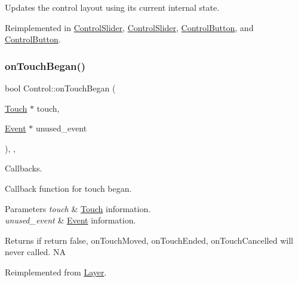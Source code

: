 Updates the control layout using its current internal state. 

Reimplemented in \hyperlink{classControlSlider_a52ab7abbbcefc12704917d04dfea67c9}{Control\+Slider}, \hyperlink{classControlSlider_a2325b1df970fb4aff1ccb29aea4a20ea}{Control\+Slider}, \hyperlink{classControlButton_af0fc9343439e52c30c72a87183807487}{Control\+Button}, and \hyperlink{classControlButton_acdbe1882298d4920b6ba59e7c72d6aaf}{Control\+Button}.

\mbox{\label{classControl_a0cf2e20cea5b57b263e965be4a19ab52}} 
\subsubsection{\texorpdfstring{on\+Touch\+Began()}{onTouchBegan()}\hspace{0.1cm}{\footnotesize\ttfamily [1/2]}}
{\footnotesize\ttfamily bool Control\+::on\+Touch\+Began (\begin{DoxyParamCaption}\item[{\hyperlink{classTouch}{Touch} $\ast$}]{touch,  }\item[{\hyperlink{classEvent}{Event} $\ast$}]{unused\+\_\+event }\end{DoxyParamCaption})\hspace{0.3cm}{\ttfamily [inline]}, {\ttfamily [override]}, {\ttfamily [virtual]}}



Callbacks. 

Callback function for touch began.


\begin{DoxyParams}{Parameters}
{\em touch} & \hyperlink{classTouch}{Touch} information. \\
\hline
{\em unused\+\_\+event} & \hyperlink{classEvent}{Event} information. \\
\hline
\end{DoxyParams}
\begin{DoxyReturn}{Returns}
if return false, on\+Touch\+Moved, on\+Touch\+Ended, on\+Touch\+Cancelled will never called.  NA 
\end{DoxyReturn}


Reimplemented from \hyperlink{classLayer_abe632dc131bdeb3d603090d4d31db25c}{Layer}.



